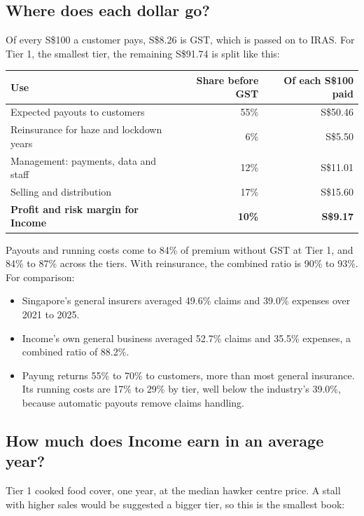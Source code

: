 \documentclass[11pt,a4paper]{article}
\newcommand{\head}{\rowcolor{soft}}
\newcommand{\sgd}{\textup{S\$}}
\begin{document}
\subsection{Where does each dollar go?}

Of every \sgd 100 a customer pays, \sgd 8.26 is GST, which is passed on to IRAS. For Tier 1, the smallest tier, the remaining \sgd 91.74 is split like this:

\begin{center}
\small
\begin{tabular}{|l|r|r|}
\hline
\head \textbf{Use} & \textbf{Share before GST} & \textbf{Of each \sgd 100 paid} \\
\hline
Expected payouts to customers & 55\% & \sgd 50.46 \\
\hline
Reinsurance for haze and lockdown years & 6\% & \sgd 5.50 \\
\hline
Management: payments, data and staff & 12\% & \sgd 11.01 \\
\hline
Selling and distribution & 17\% & \sgd 15.60 \\
\hline
\textbf{Profit and risk margin for Income} & \textbf{10\%} & \textbf{\sgd 9.17} \\
\hline
\end{tabular}
\end{center}

Payouts and running costs come to 84\% of premium without GST at Tier 1, and 84\% to 87\% across the tiers. With reinsurance, the combined ratio is 90\% to 93\%. For comparison:
\begin{itemize}[leftmargin=1.2em]
  \item Singapore's general insurers averaged 49.6\% claims and 39.0\% expenses over 2021 to 2025.\cite{mas}
  \item Income's own general business averaged 52.7\% claims and 35.5\% expenses, a combined ratio of 88.2\%.\cite{mas}
  \item Payung returns 55\% to 70\% to customers, more than most general insurance. Its running costs are 17\% to 29\% by tier, well below the industry's 39.0\%, because automatic payouts remove claims handling.
\end{itemize}

\subsection{How much does Income earn in an average year?}

Tier 1 cooked food cover, one year, at the median hawker centre price. A stall with higher sales would be suggested a bigger tier, so this is the smallest book:
\end{document}
